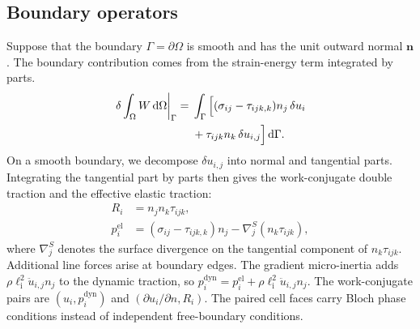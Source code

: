 \subsection{Boundary operators}
Suppose that the boundary $\Gamma=\partial\Omega$ is smooth and has the unit outward normal $\bm n$. The boundary contribution comes from the strain-energy term integrated by parts.
\begin{equation}
\begin{split}
\left.\delta\int_\Omega W\,\mathrm{d}\Omega\right|_\Gamma
={}& \int_\Gamma \Big[(\sigma_{ij}-\tau_{ijk,k})n_j\,\delta u_i \\
&+ \tau_{ijk}n_k\,\delta u_{i,j}\Big] \,\mathrm{d}\Gamma.
\end{split}
\label{eq:elastic_boundary_work}
\end{equation}
On a smooth boundary, we decompose $\delta u_{i,j}$ into normal and tangential parts. Integrating the tangential part by parts then gives the work-conjugate double traction and the effective elastic traction:
\begin{equation}
\begin{split}
R_i &= n_jn_k\tau_{ijk}, \\
p_i^{\mathrm{el}} &= (\sigma_{ij}-\tau_{ijk,k})n_j - \nabla_j^S(n_k\tau_{ijk}),
\end{split}
\label{eq:traction_def}
\end{equation}
where $\nabla_j^S$ denotes the surface divergence on the tangential component of $n_k\tau_{ijk}$. Additional line forces arise at boundary edges. The gradient micro-inertia adds $\rho\ell_{\mathrm{i}}^2\ddot u_{i,j}n_j$ to the dynamic traction, so $p_i^{\mathrm{dyn}}=p_i^{\mathrm{el}}+\rho\ell_{\mathrm{i}}^2\ddot u_{i,j}n_j$. The work-conjugate pairs are $(u_i,p_i^{\mathrm{dyn}})$ and $(\partial u_i/\partial n,R_i)$. The paired cell faces carry Bloch phase conditions instead of independent free-boundary conditions.
